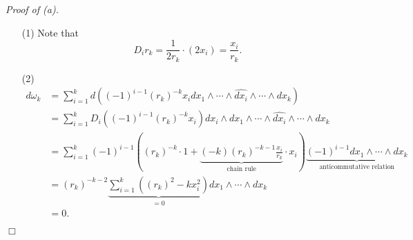 \documentclass{article}
\begin{document}
\emph{Proof of (a).}
\begin{enumerate}
\item[(1)]
  Note that
  \[
    D_i r_k = \frac{1}{2r_k} \cdot (2x_i) = \frac{x_i}{r_k}.
  \]
\item[(2)]
  \begin{align*}
    d\omega_k
    &= \sum_{i=1}^{k} d\left(
      (-1)^{i-1} (r_k)^{-k} x_i
      dx_1 \wedge \cdots \wedge \widehat{dx_i} \wedge \cdots \wedge dx_k\right) \\
    &= \sum_{i=1}^{k} D_i \left( (-1)^{i-1} (r_k)^{-k} x_i \right)
      dx_i \wedge dx_1 \wedge \cdots \wedge \widehat{dx_i} \wedge \cdots \wedge dx_k \\
    &= \sum_{i=1}^{k} (-1)^{i-1} \left(
      (r_k)^{-k} \cdot 1 + \underbrace{(-k)(r_k)^{-k-1} \frac{x_i}{r_k}}_{\text{chain rule}}
        \cdot x_i \right)
      \underbrace{(-1)^{i-1} dx_1 \wedge \cdots \wedge dx_k}_{\text{anticommutative relation}} \\
    &= (r_k)^{-k-2} \underbrace{\sum_{i=1}^{k} \left(
      (r_k)^2 - k x_i^2 \right)}_{= 0}
      dx_1 \wedge \cdots \wedge dx_k \\
    &= 0.
  \end{align*}
\end{enumerate}
$\Box$ \\
\end{document}
